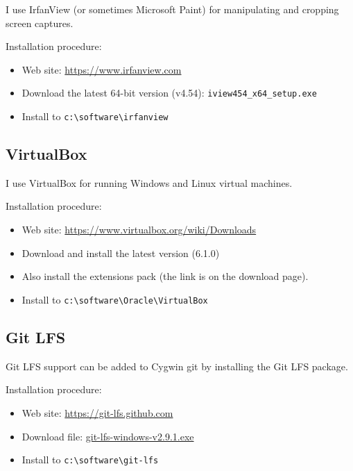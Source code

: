 \documentclass[10pt,twoside]{article}
\begin{document}
I use IrfanView (or sometimes Microsoft Paint) for manipulating and cropping
screen captures.

\vskip5mm
\noindent Installation procedure:
%
\begin{itemize}
\item Web site: \href{https://www.irfanview.com}{https://www.irfanview.com}
\item Download the latest 64-bit version (v4.54):
\verb+iview454_x64_setup.exe+
\item Install to \verb+c:\software\irfanview+
\end{itemize}

\subsection{VirtualBox}

I use VirtualBox for running Windows and Linux virtual machines.

\vskip5mm
\noindent Installation procedure:
%
\begin{itemize}
\item Web site:
\href{https://www.virtualbox.org/wiki/Downloads}{https://www.virtualbox.org/wiki/Downloads}
\item Download and install the latest version (6.1.0)
\item Also install the extensions pack (the link is on the download page).
\item Install to \verb+c:\software\Oracle\VirtualBox+
\end{itemize}

\subsection{Git LFS}

Git LFS support can be added to Cygwin git by installing the Git LFS package.

\vskip5mm
\noindent Installation procedure:
%
\begin{itemize}
\item Web site:
\href{https://git-lfs.github.com}{https://git-lfs.github.com}
\item Download file:
\href{https://github.com/git-lfs/git-lfs/releases/download/v2.9.1/git-lfs-windows-v2.9.1.exe}
{git-lfs-windows-v2.9.1.exe}
\item Install to \verb+c:\software\git-lfs+
\end{itemize}
\end{document}
